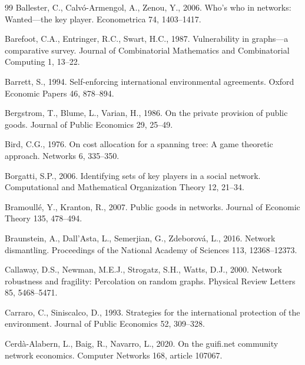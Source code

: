 \documentclass[preprint,12pt,authoryear]{elsarticle}
\begin{document}
\begin{thebibliography}{99}
Ballester, C., Calv\'o-Armengol, A., Zenou, Y., 2006.
Who's who in networks: Wanted---the key player. Econometrica 74, 1403--1417.

Barefoot, C.A., Entringer, R.C., Swart, H.C., 1987.
Vulnerability in graphs---a comparative survey.
Journal of Combinatorial Mathematics and Combinatorial Computing 1, 13--22.

Barrett, S., 1994.
Self-enforcing international environmental agreements.
Oxford Economic Papers 46, 878--894.

Bergstrom, T., Blume, L., Varian, H., 1986.
On the private provision of public goods. Journal of Public Economics 29,
25--49.

Bird, C.G., 1976.
On cost allocation for a spanning tree: A game theoretic approach.
Networks 6, 335--350.

Borgatti, S.P., 2006.
Identifying sets of key players in a social network.
Computational and Mathematical Organization Theory 12, 21--34.

Bramoull\'{e}, Y., Kranton, R., 2007.
Public goods in networks. Journal of Economic Theory 135, 478--494.

Braunstein, A., Dall'Asta, L., Semerjian, G., Zdeborov\'a, L., 2016.
Network dismantling. Proceedings of the National Academy of Sciences 113,
12368--12373.

Callaway, D.S., Newman, M.E.J., Strogatz, S.H., Watts, D.J., 2000.
Network robustness and fragility: Percolation on random graphs.
Physical Review Letters 85, 5468--5471.

Carraro, C., Siniscalco, D., 1993.
Strategies for the international protection of the environment.
Journal of Public Economics 52, 309--328.

Cerd\`a-Alabern, L., Baig, R., Navarro, L., 2020.
On the guifi.net community network economics.
Computer Networks 168, article 107067.


\end{thebibliography}
\end{document}

